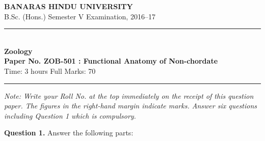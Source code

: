 \documentclass[11pt,a4paper]{article}
\begin{document}
\begin{center}
  {\large\bfseries BANARAS HINDU UNIVERSITY}\\[2pt]
  {\normalsize B.Sc. (Hons.) Semester V Examination, 2016--17}\\[6pt]
  \rule{0.8\linewidth}{0.5pt}\\[6pt]
  {\large\bfseries Zoology}\\[4pt]
  {\large\bfseries Paper No. ZOB-501 : Functional Anatomy of Non-chordate}\\[4pt]
  {\normalsize Time: 3 hours \hfill Full Marks: 70}
\end{center}

\rule{\linewidth}{0.4pt}

\smallskip



\noindent   \textit{Note: Write your Roll No. at the top immediately on the receipt of this question paper. The figures in the right-hand margin indicate marks. Answer six questions including Question 1 which is compulsory.}

\bigskip



\noindent   \textbf{Question 1.} Answer the following parts:
\end{document}
